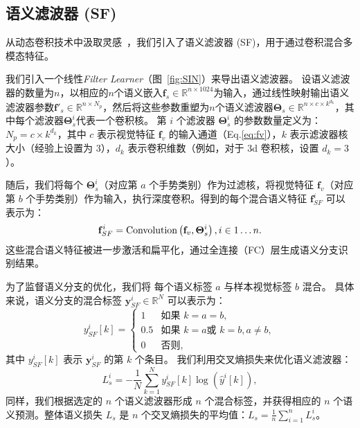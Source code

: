 \subsection{语义滤波器 (SF)}
从动态卷积技术中汲取灵感~\cite{yang2019condconv,chen2020dynamic}，我们引入了语义滤波器 (SF)，用于通过卷积混合多模态特征。%

我们引入一个线性\emph{Filter Learner}（图~\ref{fig:SIN}）来导出语义滤波器。
设语义滤波器的数量为$n$，以相应的$n$个语义嵌入$\mathbf{f}_{s} \in \mathbb{R}^{n\times 1024}$为输入，通过线性映射输出语义滤波器参数$\mathbf{f'}_{s}\in \mathbb{R}^{n\times N_p}$，然后将这些参数重塑为$n$个语义滤波器$\boldsymbol{\Theta}_{s}\in \mathbb{R}^{n\times c\times k^{d_k}}$，其中每个滤波器$\boldsymbol{\Theta}_{s}^i$代表一个卷积核。
第 $i$ 个滤波器 $\boldsymbol{\Theta}_{s}^i$ 的参数数量定义为：$N_p=c\times k^{d_k}$，其中 $c$ 表示视觉特征 $\mathbf{f}_{v}$ 的输入通道（Eq.\ref{eq:fv}），$k$ 表示滤波器核大小（经验上设置为 3），$d_k$ 表示卷积维数（例如，对于 3d 卷积核，设置 $d_k=3$）。

随后，我们将每个 $\boldsymbol{\Theta}_{s}^i$（对应第 $a$ 个手势类别）作为过滤核，将视觉特征 $\mathbf{f}_{v}$（对应第 $b$ 个手势类别）作为输入，执行深度卷积。得到的每个混合语义特征 $\mathbf{f}_{SF}^i$ 可以表示为：
\begin{equation}
\mathbf{f}_{SF}^{i} = \text{Convolution}\left(\mathbf{f}_{v}, \boldsymbol{\Theta}_{s}^i\right),\quad i \in 1\dots n. \\
\end{equation}
这些混合语义特征被进一步激活和扁平化，通过全连接（FC）层生成语义分支识别结果。

为了监督语义分支的优化，我们将 \cite{zuo2023natural} 每个语义标签 $a$ 与样本视觉标签 $b$ 混合。
具体来说，语义分支的混合标签 $\mathbf{y}_{SF}^i \in \mathbb{R}^N$ 可以表示为：
\begin{equation}
y_{SF}^i[k] = \begin{cases}
1 & \text{如果 } k = a = b,\\
0.5 & \text{如果 } k = a \text{或 } k = b, a\neq b,\\
0 & \text{否则,}
\end{cases}
\end{equation}
其中 $y_{SF}^i[k]$ 表示 $\mathbf{y}_{SF}^i$ 的第 $k$ 个条目。
我们利用交叉熵损失来优化语义滤波器：
\begin{equation}
L_{s}^i = -\frac{1}{N}\sum_{k=1}^{N}{{y}_{SF}^i[k] \log\left(\hat{y}^i[k]\right)},
\end{equation}
同样，我们根据选定的 $n$ 个语义滤波器形成 $n$ 个混合标签，并获得相应的 $n$ 个语义预测。整体语义损失 $L_{s}$ 是 $n$ 个交叉熵损失的平均值：$L_{s} = \frac{1}{n}\sum_{i=1}^{n}{L_{s}^i}$。

